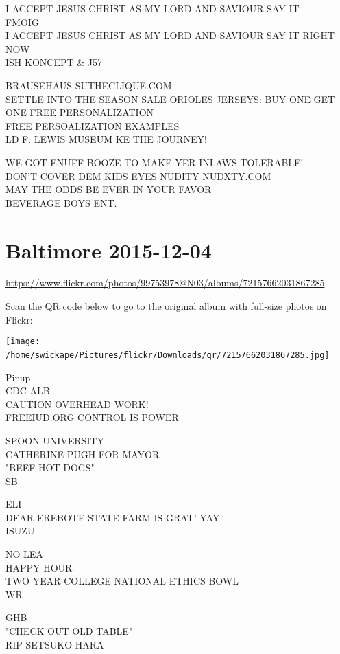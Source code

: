 \documentclass[10pt,letterpaper]{article}
\begin{document}
I ACCEPT JESUS CHRIST AS MY LORD AND SAVIOUR SAY IT\\
FMOIG\\
I ACCEPT JESUS CHRIST AS MY LORD AND SAVIOUR SAY IT RIGHT NOW\\
ISH KONCEPT \& J57

BRAUSEHAUS SUTHECLIQUE.COM\\
SETTLE INTO THE SEASON SALE ORIOLES JERSEYS: BUY ONE GET ONE FREE PERSONALIZATION\\
FREE PERSOALIZATION EXAMPLES\\
LD F. LEWIS MUSEUM KE THE JOURNEY!

WE GOT ENUFF BOOZE TO MAKE YER INLAWS TOLERABLE!\\
DON'T COVER DEM KIDS EYES NUDITY NUDXTY.COM\\
MAY THE ODDS BE EVER IN YOUR FAVOR\\
BEVERAGE BOYS ENT.
\

\section*{Baltimore 2015-12-04}

\url{https://www.flickr.com/photos/99753978@N03/albums/72157662031867285}

Scan the QR code below to go to the original album with full-size photos on Flickr:

\texttt{[image: /home/swickape/Pictures/flickr/Downloads/qr/72157662031867285.jpg]}
\

Pinup\\
CDC ALB\\
CAUTION OVERHEAD WORK!\\
FREEIUD.ORG CONTROL IS POWER

SPOON UNIVERSITY\\
CATHERINE PUGH FOR MAYOR\\
"BEEF HOT DOGS"\\
SB

ELI\\
DEAR EREBOTE STATE FARM IS GRAT!  YAY\\
ISUZU

NO LEA\\
HAPPY HOUR\\
TWO YEAR COLLEGE NATIONAL ETHICS BOWL\\
WR

GHB\\
"CHECK OUT OLD TABLE"\\
RIP SETSUKO HARA
\end{document}
